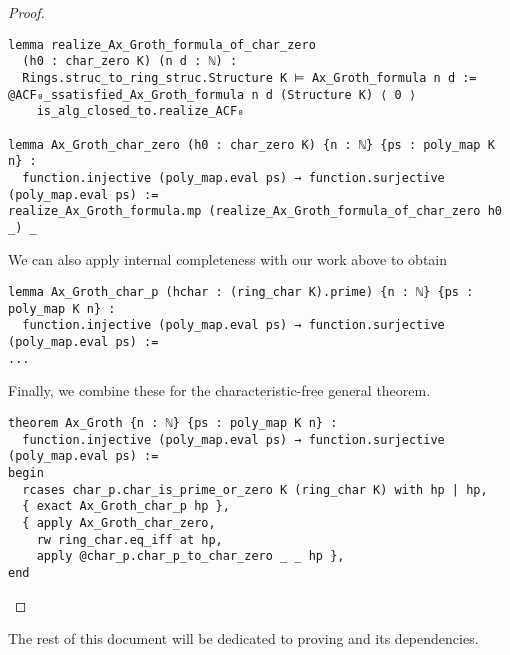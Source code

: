 \begin{proof}
\begin{lstlisting}
lemma realize_Ax_Groth_formula_of_char_zero
  (h0 : char_zero K) (n d : ℕ) :
  Rings.struc_to_ring_struc.Structure K ⊨ Ax_Groth_formula n d :=
@ACF₀_ssatisfied_Ax_Groth_formula n d (Structure K) ⟨ 0 ⟩
    is_alg_closed_to.realize_ACF₀

lemma Ax_Groth_char_zero (h0 : char_zero K) {n : ℕ} {ps : poly_map K n} :
  function.injective (poly_map.eval ps) → function.surjective (poly_map.eval ps) :=
realize_Ax_Groth_formula.mp (realize_Ax_Groth_formula_of_char_zero h0 _) _ \end{lstlisting}

We can also apply internal completeness with our work above to obtain

\begin{lstlisting}
lemma Ax_Groth_char_p (hchar : (ring_char K).prime) {n : ℕ} {ps : poly_map K n} :
  function.injective (poly_map.eval ps) → function.surjective (poly_map.eval ps) :=
... \end{lstlisting}

Finally, we combine these for the characteristic-free general theorem.

\begin{lstlisting}
theorem Ax_Groth {n : ℕ} {ps : poly_map K n} :
  function.injective (poly_map.eval ps) → function.surjective (poly_map.eval ps) :=
begin
  rcases char_p.char_is_prime_or_zero K (ring_char K) with hp | hp,
  { exact Ax_Groth_char_p hp },
  { apply Ax_Groth_char_zero,
    rw ring_char.eq_iff at hp,
    apply @char_p.char_p_to_char_zero _ _ hp },
end \end{lstlisting}
\end{proof}

The rest of this document will be dedicated to proving 
and its dependencies.
